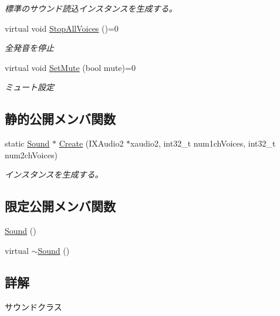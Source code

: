 \begin{DoxyCompactItemize}
\begin{DoxyCompactList}\small\item\em 標準のサウンド読込インスタンスを生成する。 \end{DoxyCompactList}\item 
virtual void \mbox{\hyperlink{class_effekseer_sound_1_1_sound_ace2026566bc2bdaf49962293c5b06aa2}{Stop\+All\+Voices}} ()=0
\begin{DoxyCompactList}\small\item\em 全発音を停止 \end{DoxyCompactList}\item 
virtual void \mbox{\hyperlink{class_effekseer_sound_1_1_sound_a60df80be173cb76ef495bde597a7c407}{Set\+Mute}} (bool mute)=0
\begin{DoxyCompactList}\small\item\em ミュート設定 \end{DoxyCompactList}\end{DoxyCompactItemize}
\subsection*{静的公開メンバ関数}
\begin{DoxyCompactItemize}
\item 
static \mbox{\hyperlink{class_effekseer_sound_1_1_sound}{Sound}} $\ast$ \mbox{\hyperlink{class_effekseer_sound_1_1_sound_a529131b733c88f728949919a3b23c3e6}{Create}} (I\+X\+Audio2 $\ast$xaudio2, int32\+\_\+t num1ch\+Voices, int32\+\_\+t num2ch\+Voices)
\begin{DoxyCompactList}\small\item\em インスタンスを生成する。 \end{DoxyCompactList}\end{DoxyCompactItemize}
\subsection*{限定公開メンバ関数}
\begin{DoxyCompactItemize}
\item 
\mbox{\hyperlink{class_effekseer_sound_1_1_sound_a810f0d806967aefab868ee61eee17847}{Sound}} ()
\item 
virtual \mbox{\hyperlink{class_effekseer_sound_1_1_sound_a6367d1e9d3c05ec668f7183454e51d3d}{$\sim$\+Sound}} ()
\end{DoxyCompactItemize}


\subsection{詳解}
サウンドクラス 

